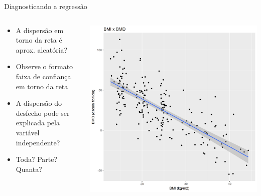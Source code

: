 \documentclass{beamer}
\begin{document}
\begin{frame}{Diagnosticando a regressão}
  \begin{columns}
    \begin{column}{5cm}
      \begin{itemize}
        \small
      \item A dispersão em torno da reta é aprox. aleatória?
        \bigskip
      \item Observe o formato faixa de confiança em torno da reta
        \bigskip
        \scriptsize
      \item A dispersão do desfecho pode ser explicada pela variável independente?
      \item Toda? Parte? Quanta?
      \end{itemize}
    \end{column}
    \begin{column}{5cm}
      \begin{center}
        \includegraphics[width=1.1\textwidth]{Cap18-19/pratica-plot2}
      \end{center}
    \end{column}
  \end{columns}
\end{frame}
\end{document}

